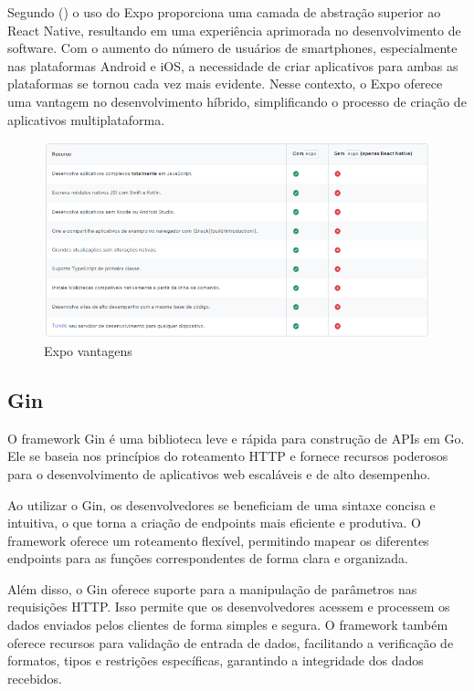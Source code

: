 Segundo (\textcite{Hugo}) o uso do Expo proporciona uma camada de abstração superior ao React Native, resultando em uma experiência aprimorada no desenvolvimento de software. Com o aumento do 
número de usuários de smartphones, especialmente nas plataformas Android e iOS, a necessidade de criar aplicativos para ambas as plataformas se tornou cada vez mais 
evidente. Nesse contexto, o Expo oferece uma vantagem no desenvolvimento híbrido, simplificando o processo de criação de aplicativos multiplataforma.


\begin{figure}[htb]
	\caption{\label{fig:Fig_1}Expo vantagens}
	\begin{center}
		\includegraphics{images/expo.png}
	\end{center}
\end{figure}

\subsection{Gin}
O framework Gin é uma biblioteca leve e rápida para construção de APIs em Go. Ele se baseia nos princípios do roteamento HTTP e fornece recursos poderosos para o desenvolvimento de aplicativos web escaláveis e de alto desempenho.

Ao utilizar o Gin, os desenvolvedores se beneficiam de uma sintaxe concisa e intuitiva, o que torna a criação de endpoints mais eficiente e produtiva. O framework oferece um roteamento flexível, permitindo mapear os diferentes endpoints para as funções correspondentes de forma clara e organizada.

Além disso, o Gin oferece suporte para a manipulação de parâmetros nas requisições HTTP. Isso permite que os desenvolvedores acessem e processem os dados enviados pelos clientes de forma simples e segura. O framework também oferece recursos para validação de entrada de dados, facilitando a verificação de formatos, tipos e restrições específicas, garantindo a integridade dos dados recebidos.

